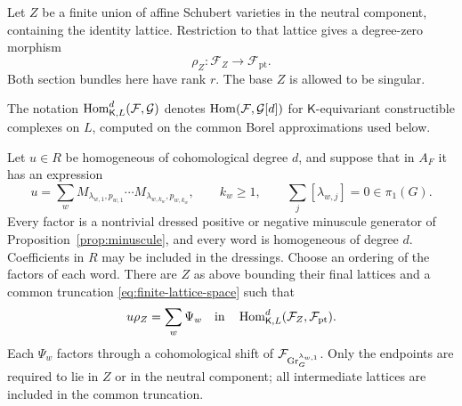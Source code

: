 Let $Z$ be a finite union of affine Schubert varieties in the neutral
component, containing the identity lattice.  Restriction to that lattice
gives a degree-zero morphism
\begin{equation}
 \label{eq:restriction-at-identity}
 \rho_Z:\mathcal F_Z\longrightarrow\mathcal F_{\mathrm{pt}}.
\end{equation}
Both section bundles here have rank $r$.  The base $Z$ is allowed to be
singular.

The notation $\operatorname{Hom}^d_{\mathsf K,L}(\mathcal F,\mathcal G)$ denotes
$\operatorname{Hom}(\mathcal F,\mathcal G[d])$ for $\mathsf K$-equivariant constructible
complexes on $L$, computed on the common Borel approximations used below.

\begin{lemma}
 \label{lem:correspondence-factorization}
Let $u\in R$ be homogeneous of cohomological degree $d$, and suppose that
in $A_F$ it has an expression
\begin{equation}
 \label{eq:neutral-word-relation}
 u=\sum_w M_{\lambda_{w,1},p_{w,1}}\cdots
                 M_{\lambda_{w,k_w},p_{w,k_w}},
 \qquad k_w\geq1,
 \qquad \sum_j[\lambda_{w,j}]=0\in\pi_1(G).
\end{equation}
Every factor is a nontrivial dressed positive or negative minuscule
generator of Proposition~\ref{prop:minuscule}, and every word is homogeneous
of degree $d$.  Coefficients in $R$ may be included in the dressings.
Choose an ordering of the factors of each word.  There are $Z$ as above
bounding their final lattices and a common truncation
\eqref{eq:finite-lattice-space} such that
\begin{equation}
 \label{eq:finite-relation-factorization}
 u\rho_Z=\sum_w\Psi_w
 \quad\text{in}\quad
 \operatorname{Hom}^d_{\mathsf K,L}
       (\mathcal F_Z,\mathcal F_{\mathrm{pt}}).
\end{equation}
Each $\Psi_w$ factors through a cohomological shift of
$\mathcal F_{\operatorname{Gr}_G^{\lambda_{w,1}}}$.
Only the endpoints are required to lie in $Z$ or in the neutral component;
all intermediate lattices are included in the common truncation.
\end{lemma}

